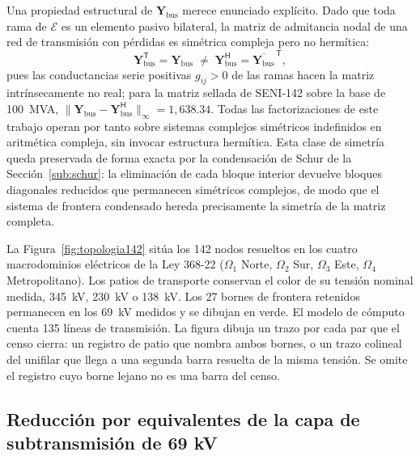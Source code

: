 Una propiedad estructural de $\mathbf{Y}_{\mathrm{bus}}$ merece enunciado explícito. Dado que toda rama de $\mathcal{E}$ es un elemento pasivo bilateral, la matriz de admitancia nodal de una red de transmisión con pérdidas es simétrica compleja pero no hermítica:
\begin{equation}
\mathbf{Y}_{\mathrm{bus}}^{\mathsf{T}} = \mathbf{Y}_{\mathrm{bus}} \;\ne\; \mathbf{Y}_{\mathrm{bus}}^{\mathsf{H}} = \overline{\mathbf{Y}_{\mathrm{bus}}}^{\,\mathsf{T}},
\label{eq:nonhermitian}
\end{equation}
pues las conductancias serie positivas $g_{ij} > 0$ de las ramas hacen la matriz intrínsecamente no real; para la matriz sellada de SENI-142 sobre la base de 100~MVA, $\|\mathbf{Y}_{\mathrm{bus}} - \mathbf{Y}_{\mathrm{bus}}^{\mathsf{H}}\|_{\infty} = 1{,}638.34$. Todas las factorizaciones de este trabajo operan por tanto sobre sistemas complejos simétricos indefinidos en aritmética compleja, sin invocar estructura hermítica. Esta clase de simetría queda preservada de forma exacta por la condensación de Schur de la Sección~\ref{sub:schur}: la eliminación de cada bloque interior devuelve bloques diagonales reducidos que permanecen simétricos complejos, de modo que el sistema de frontera condensado hereda precisamente la simetría de la matriz completa.

La Figura~\ref{fig:topologia142} sitúa los 142 nodos resueltos en los cuatro macrodominios eléctricos de la Ley 368-22 ($\Omega_1$ Norte, $\Omega_2$ Sur, $\Omega_3$ Este, $\Omega_4$ Metropolitano). Los patios de transporte conservan el color de su tensión nominal medida, 345~kV, 230~kV o 138~kV. Los 27 bornes de frontera retenidos permanecen en los 69~kV medidos y se dibujan en verde. El modelo de cómputo cuenta 135 líneas de transmisión. La figura dibuja un trazo por cada par que el censo cierra: un registro de patio que nombra ambos bornes, o un trazo colineal del unifilar que llega a una segunda barra resuelta de la misma tensión. Se omite el registro cuyo borne lejano no es una barra del censo.




\subsection{Reducción por equivalentes de la capa de subtransmisión de 69 kV}
\label{sub:reduction}

